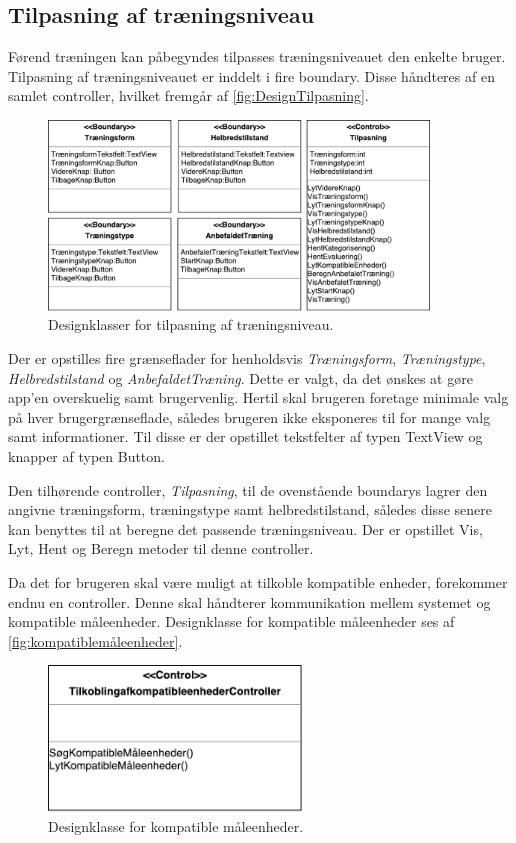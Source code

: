 \subsection*{Tilpasning af træningsniveau}
Førend træningen kan påbegyndes tilpasses træningsniveauet den enkelte bruger. Tilpasning af træningsniveauet er inddelt i fire boundary. Disse håndteres af en samlet controller, hvilket fremgår af \autoref{fig:DesignTilpasning}.

\begin{figure} [H]
\centering
\includegraphics[width=0.9\textwidth]{figures/MVC/MVCTilpasning}
\caption{Designklasser for tilpasning af træningsniveau.}
\label{fig:DesignTilpasning}
\end{figure}

\noindent
Der er opstilles fire grænseflader for henholdsvis \textit{Træningsform}, \textit{Træningstype}, \textit{Helbredstilstand} og \textit{AnbefaldetTræning}. Dette er valgt, da det ønskes at gøre app’en overskuelig samt brugervenlig. Hertil skal brugeren foretage minimale valg på hver brugergrænseflade, således brugeren ikke eksponeres til for mange valg samt informationer. Til disse er der opstillet tekstfelter af typen TextView og knapper af typen Button.   

Den tilhørende controller, \textit{Tilpasning}, til de ovenstående boundarys lagrer den angivne træningsform, træningstype samt helbredstilstand, således disse senere kan benyttes til at beregne det passende træningsniveau. Der er opstillet Vis, Lyt, Hent og Beregn metoder til denne controller. 

Da det for brugeren skal være muligt at tilkoble kompatible enheder, forekommer endnu en controller. Denne skal håndterer kommunikation mellem systemet og kompatible måleenheder. Designklasse for kompatible måleenheder ses af \autoref{fig:kompatiblemåleenheder}.

\begin{figure} [H]
\centering
\includegraphics[width=0.6\textwidth]{figures/MVC/MVCKompMaale}
\caption{Designklasse for kompatible måleenheder.}
\label{fig:kompatiblemåleenheder}
\end{figure}

